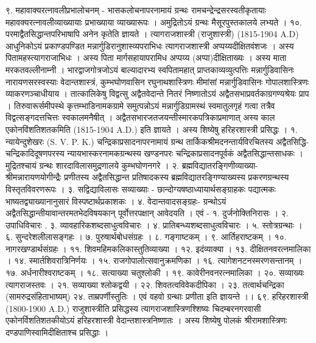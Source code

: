 ९. महावाक्यरत्नावलीप्रभालोचनम् -
भासकलोचनापरनामायं ग्रन्थः रामचन्द्रेन्द्रसरस्वतीकृतायाः महावक्यरत्नावलीव्याख्यायाः प्रभाख्याया व्याख्यारूपः । अमुद्रितोऽयं ग्रन्थः मैसूरपुस्तकालये लभ्यते ।
१०. परमाद्वैतसिद्धान्तपरिभाषापि अनेन कृतेति ज्ञायते ।
त्यागराजशास्त्री (राजुशास्त्री) (1815-1904 A.D)
आधुनिकोऽयं प्रकाण्डपण्डित मन्नार्गुडिरानुशास्व्यपराभिधः त्यागराजशास्त्री अप्पय्यदीक्षितवंशजः । अस्य पितामहस्त्यागराजाभिधः । अस्य पिता मार्गसहायापरामिध अप्पय्य (अप्पा)दीक्षिताख्यः । अस्य माता मरकतवल्लीनाम्नी । भारद्वाजगोत्रजोऽयं बाल्यादारभ्य स्वपितामहात् प्राप्तकाव्यव्युत्पत्तिः मन्नार्गुडिवासिनः नारायणसरस्वस्याः वेदान्तशास्त्रं, कुम्भघोणवासिन रघुनाथशास्त्रिणः मीमांसां मन्नार्गुडिवासिनः गोपालशास्त्रिणः व्याकरणञ्चाधीयाय । तात्कालिकेषु विद्वत्सु अद्वैतवेदान्ते नितरं निष्णातोऽयं अद्वैतसभाप्रवर्तकाग्रगण्यश्रेयः प्राप । तिरुवारूर्समीपस्थे कृत्तम्भाडिनामकग्रामे समुत्पन्नोऽयं मन्नार्गुडिग्रामस्थं स्वमातुलगृहं गत्वा तत्रैव विद्वत्सङ्गदत्तचित्तः स्वकालमनैषीत् । अद्वैतसभारजतजयन्तीस्मारकपत्रिकाप्रमाणात् अस्य काल एकोनविंशतिशतकमिति (1815-1904 A.D.) इति ज्ञायते । अस्य शिष्येषु हरिहरशास्त्री प्रसिद्धः ।
१. न्यायेन्दुशेखरः (S. V. P. K.)
चन्द्रिकाप्रसादनापरनामायं ग्रन्थ तार्किकश्रीमदनन्तार्यविरचितस्य अद्वैतसिद्धि-चन्द्रिकादिदूषणपरस्य न्यायभास्करनामकग्रन्थस्य खण्डनपरः चन्द्रिकाप्रसादनपूर्वकं अद्वैतसिद्धान्तसाधकः । मुद्रितश्चायं ग्रन्थः शारदाविलासमुद्रणालये कुम्भघोणनगरे ।
२. ब्रह्मविद्यातरङ्गिणीव्याख्या-श्रीमन्नारायणयोगीन्द्रैः प्रणीतस्य अद्वैतसिद्धान्त प्रतिषादकस्य ब्रह्मविद्यातरङ्गिण्याख्यस्य प्रकरणग्रन्थस्य विस्तृतविवरणरूपः ।
३. सद्विद्याविलासः सव्याख्याः - छान्दोग्यषष्ठाध्यायार्थसङ्ग्राहकः पद्यात्मकः भाष्यतद्व्याख्यानानुसारं विस्पष्टार्थप्रकाशकः ।
४. वेदान्तवादसङ्ग्रहः- ग्रन्थोऽयं अद्वैतसिद्धान्तीयावान्तरमतभेदविषयकान् पूर्वोत्तरपक्षान् आवेदयति ।
एवं - १. दुर्जनोक्तिनिरासः । २. उपाधिविचारः . ३. व्यावहारिकशब्दसाधुत्वविचारः । ४. प्रातिबन्ध्यशब्दसाधुत्वविचारः । ५. स्तोत्रग्रन्थाः । ६. सुन्दरेशलीलासङ्गहः । ७. पुरुषार्थबोधसंग्रहः । ८. गङ्गाष्टकम् । ९. आर्तिहराष्टकम् । १०. नागरखण्डार्थसंग्रहः । ११. शिवमहिमकलिकास्तुतिव्याख्या । १२. इदंव्याक्या । १३. दीक्षितनवरत्नमालिका । १४. स्मार्तशिवरात्रिनिर्णयः । १५. राजगोपालोत्सवानुक्रमणिका । १६. त्यागेशनटनस्मरणसन्तानम् । १७. अर्धनारीश्वराष्टकम् । १८. सत्याख्या चतुश्लोकी । १९. कावेरीनवनरत्नमालिका । २०. सव्याख्यः त्यागराजस्तवः । २१. सव्याख्या श्लोकद्वयी । २२. शिवतत्वविवेकदीपिका । २३. तत्वार्थचन्द्रिका (सामरुद्रसंहिताभाष्यम्) २४. ताम्रपर्णीस्तुतिः । एवं वहवो ग्रन्थाः प्रणीता इति ज्ञायन्ते ।।
६९. हरिहरशास्त्री (1800-1900 A.D.)
राजुशास्त्रीति प्रसिद्धस्य त्यागराजशास्त्रिणश्शिष्यः चिदम्बरनगरवासी एकोनर्विशतिशतकीयोऽयं हरिहरशास्त्री वेदान्तशास्त्रनिष्णातः । अस्य शिष्येषु पोलकं श्रीरामशास्त्रिणः दण्डपाणिस्वामिदीक्षिताश्च प्रसिद्धाः ।
